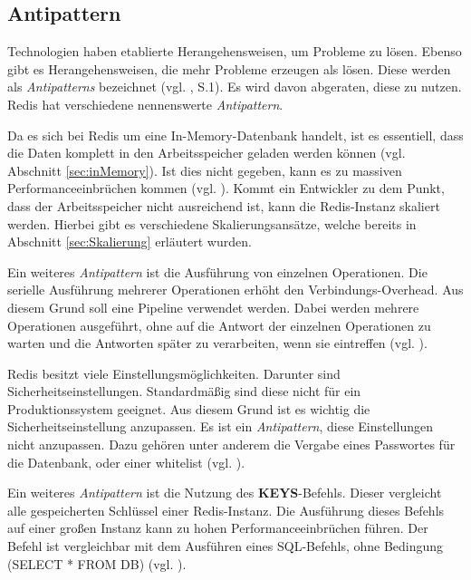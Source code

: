 
\subsection{Antipattern}
Technologien haben etablierte Herangehensweisen, um Probleme zu lösen. Ebenso gibt es Herangehensweisen, die mehr Probleme erzeugen als lösen. Diese werden als \textit{Antipatterns} bezeichnet (vgl. \cite{antipattern}, S.1). Es wird davon abgeraten, diese zu nutzen. \acs{Redis} hat verschiedene nennenswerte \textit{Antipattern}.

Da es sich bei \acs{Redis} um eine In-Memory-Datenbank handelt, ist es essentiell, dass die Daten komplett in den Arbeitsspeicher geladen werden können (vgl. Abschnitt \ref{sec:inMemory}). Ist dies nicht gegeben, kann es zu massiven Performanceeinbrüchen kommen (vgl. \cite{Redis-Docs-antipattern}). Kommt ein Entwickler zu dem Punkt, dass der Arbeitsspeicher nicht ausreichend ist, kann die \acs{Redis}-Instanz skaliert werden. Hierbei gibt es verschiedene Skalierungsansätze, welche bereits in Abschnitt \ref{sec:Skalierung} erläutert wurden.

Ein weiteres \textit{Antipattern} ist die Ausführung von einzelnen Operationen. Die serielle Ausführung mehrerer Operationen erhöht den Verbindungs-Overhead. Aus diesem Grund soll eine Pipeline verwendet werden. Dabei werden mehrere Operationen ausgeführt, ohne auf die Antwort der einzelnen Operationen zu warten und die Antworten später zu verarbeiten, wenn sie eintreffen (vgl. \cite{Redis-Docs-antipattern}).

\acs{Redis} besitzt viele Einstellungsmöglichkeiten. Darunter sind Sicherheitseinstellungen. Standardmäßig sind diese nicht für ein Produktionssystem geeignet. Aus diesem Grund ist es wichtig die Sicherheitseinstellung anzupassen. Es ist ein \textit{Antipattern}, diese Einstellungen nicht anzupassen. Dazu gehören unter anderem die Vergabe eines Passwortes für die Datenbank, oder einer \gls{whitelist} (vgl. \cite{Redis-Docs-antipattern}).

Ein weiteres \textit{Antipattern} ist die Nutzung des \textbf{KEYS}-Befehls. Dieser vergleicht alle gespeicherten Schlüssel einer \acs{Redis}-Instanz. Die Ausführung dieses Befehls auf einer großen Instanz kann zu hohen Performanceeinbrüchen führen. Der Befehl ist vergleichbar mit dem Ausführen eines SQL-Befehls, ohne Bedingung (SELECT * FROM DB) (vgl. \cite{Redis-Docs-antipattern}).